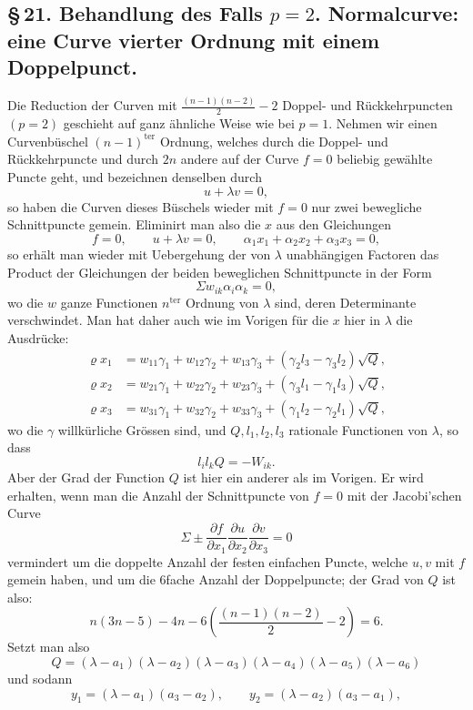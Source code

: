 \documentclass[10pt]{article}
\begin{document}
\subsection*{\S\,21. Behandlung des Falls \(p=2\). Normalcurve: eine Curve vierter Ordnung mit einem Doppelpunct.}

Die Reduction der Curven mit \(\frac{(n-1)(n-2)}{2}-2\) Doppel- und Rückkehrpuncten \((p=2)\) geschieht auf ganz ähnliche Weise wie bei \(p=1\). Nehmen wir einen Curvenbüschel \((n-1)^{\text{ter}}\) Ordnung, welches durch die Doppel- und Rückkehrpuncte und durch \(2n\) andere auf der Curve \(f=0\) beliebig gewählte Puncte geht, und bezeichnen denselben durch
\[
u+\lambda v=0,
\]
so haben die Curven dieses Büschels wieder mit \(f=0\) nur zwei bewegliche Schnittpuncte gemein. Eliminirt man also die \(x\) aus den Gleichungen
\[
f=0,\qquad u+\lambda v=0,\qquad \alpha_1x_1+\alpha_2x_2+\alpha_3x_3=0,
\]
so erhält man wieder mit Uebergehung der von \(\lambda\) unabhängigen Factoren das Product der Gleichungen der beiden beweglichen Schnittpuncte in der Form
\[
\Sigma w_{ik}\alpha_i\alpha_k=0,
\]
wo die \(w\) ganze Functionen \(n^{\text{ter}}\) Ordnung von \(\lambda\) sind, deren Determinante verschwindet. Man hat daher auch wie im Vorigen für die \(x\) hier in \(\lambda\) die Ausdrücke:
\[
\begin{aligned}
\varrho x_1&=w_{11}\gamma_1+w_{12}\gamma_2+w_{13}\gamma_3+(\gamma_2l_3-\gamma_3l_2)\sqrt Q,\\
\varrho x_2&=w_{21}\gamma_1+w_{22}\gamma_2+w_{23}\gamma_3+(\gamma_3l_1-\gamma_1l_3)\sqrt Q,\\
\varrho x_3&=w_{31}\gamma_1+w_{32}\gamma_2+w_{33}\gamma_3+(\gamma_1l_2-\gamma_2l_1)\sqrt Q,
\end{aligned}
\]
wo die \(\gamma\) willkürliche Grössen sind, und \(Q,l_1,l_2,l_3\) rationale Functionen von \(\lambda\), so dass
\[
l_il_kQ=-W_{ik}.
\]
Aber der Grad der Function \(Q\) ist hier ein anderer als im Vorigen. Er wird erhalten, wenn man die Anzahl der Schnittpuncte von \(f=0\) mit der Jacobi'schen Curve
\[
\Sigma\pm\frac{\partial f}{\partial x_1}\frac{\partial u}{\partial x_2}\frac{\partial v}{\partial x_3}=0
\]
vermindert um die doppelte Anzahl der festen einfachen Puncte, welche \(u,v\) mit \(f\) gemein haben, und um die 6fache Anzahl der Doppelpuncte; der Grad von \(Q\) ist also:
\[
n(3n-5)-4n-6\left(\frac{(n-1)(n-2)}{2}-2\right)=6.
\]
Setzt man also
\[
Q=(\lambda-a_1)(\lambda-a_2)(\lambda-a_3)(\lambda-a_4)(\lambda-a_5)(\lambda-a_6)
\]
und sodann
\[
y_1=(\lambda-a_1)(a_3-a_2),\qquad y_2=(\lambda-a_2)(a_3-a_1),
\]
\end{document}
